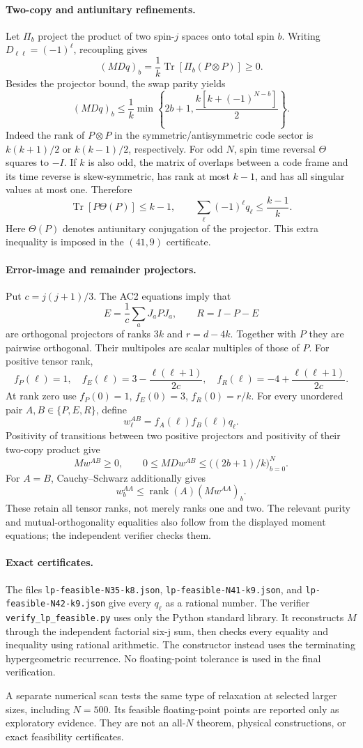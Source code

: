 \documentclass[11pt]{article}
\begin{document}
\paragraph{Two-copy and antiunitary refinements.}
Let $\Pi_b$ project the product of two spin-$j$ spaces onto total spin $b$.
Writing $D_{\ell\ell}=(-1)^\ell$, recoupling gives
\[
 (MDq)_b=\frac1k\operatorname{Tr}[\Pi_b(P\otimes P)]\ge0.
\]
Besides the projector bound, the swap parity yields
\[
 (MDq)_b\le\frac1k\min\!\left\{2b+1,
 \frac{k[k+(-1)^{N-b}]}2\right\}.
\]
Indeed the rank of $P\otimes P$ in the symmetric/antisymmetric code sector
is $k(k+1)/2$ or $k(k-1)/2$, respectively.
For odd $N$, spin time reversal $\Theta$ squares to $-I$.
If $k$ is also odd, the matrix of overlaps between a code frame and its
time reverse is skew-symmetric, has rank at most $k-1$, and has all singular
values at most one. Therefore
\[
 \operatorname{Tr}[P\Theta(P)]\le k-1,
 \qquad \sum_\ell(-1)^\ell q_\ell\le\frac{k-1}{k}.
\]
Here $\Theta(P)$ denotes antiunitary conjugation of the projector. This
extra inequality is imposed in the $(41,9)$ certificate.

\paragraph{Error-image and remainder projectors.}
Put $c=j(j+1)/3$. The AC2 equations imply that
\[
 E=\frac1c\sum_aJ_aPJ_a,\qquad R=I-P-E
\]
are orthogonal projectors of ranks $3k$ and $r=d-4k$.
Together with $P$ they are pairwise orthogonal. Their multipoles are scalar
multiples of those of $P$. For positive tensor rank,
\[
 f_P(\ell)=1,\quad f_E(\ell)=3-\frac{\ell(\ell+1)}{2c},\quad
 f_R(\ell)=-4+\frac{\ell(\ell+1)}{2c}.
\]
At rank zero use $f_P(0)=1$, $f_E(0)=3$, $f_R(0)=r/k$.
For every unordered pair $A,B\in\{P,E,R\}$, define
\[
 w_\ell^{AB}=f_A(\ell)f_B(\ell)q_\ell.
\]
Positivity of transitions between two positive projectors and positivity
of their two-copy product give
\[
 Mw^{AB}\ge0,\qquad 0\le MDw^{AB}\le
 \bigl((2b+1)/k\bigr)_{b=0}^N.
\]
For $A=B$, Cauchy--Schwarz additionally gives
\[
 w_b^{AA}\le\operatorname{rank}(A)(Mw^{AA})_b.
\]
These retain all tensor ranks, not merely ranks one and two.
The relevant purity and mutual-orthogonality equalities also follow from
the displayed moment equations; the independent verifier checks them.

\paragraph{Exact certificates.}
The files \texttt{lp-feasible-N35-k8.json},
\texttt{lp-feasible-N41-k9.json}, and
\texttt{lp-feasible-N42-k9.json} give every $q_\ell$ as a rational number.
The verifier \texttt{verify\_lp\_feasible.py} uses only the Python standard
library. It reconstructs $M$ through the independent factorial six-j sum,
then checks every equality and inequality using rational arithmetic.
The constructor instead uses the terminating hypergeometric recurrence.
No floating-point tolerance is used in the final verification.

A separate numerical scan tests the same type of relaxation at selected
larger sizes, including $N=500$. Its feasible floating-point points are
reported only as exploratory evidence. They are not an all-$N$ theorem,
physical constructions, or exact feasibility certificates.
\end{document}
